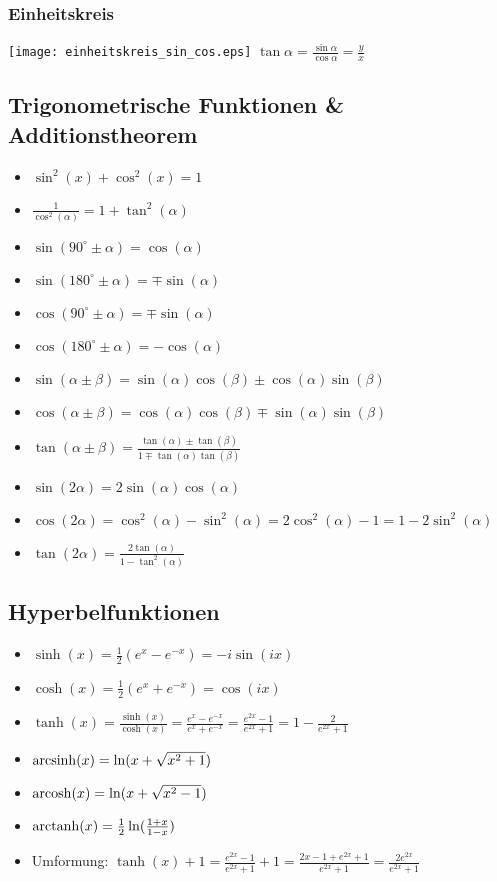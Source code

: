 \subsubsection{Einheitskreis}
\texttt{[image: einheitskreis\_sin\_cos.eps]}
$\tan \alpha = \frac{\sin \alpha}{\cos \alpha} = \frac{y}{x}$

\subsection{Trigonometrische Funktionen \& Additionstheorem}
\begin{itemize}[leftmargin=*]
	\item $\sin^2(x) + \cos^2(x) = 1$
	\item $\frac{1}{\cos^2(\alpha)} = 1 + \tan^2(\alpha)$
	\item $\sin(90^\circ \pm \alpha) = \cos(\alpha)$
	\item $\sin(180^\circ \pm \alpha) = \mp \sin(\alpha)$
	\item $\cos(90^\circ \pm \alpha) = \mp \sin(\alpha)$
	\item $\cos(180^\circ \pm \alpha) = - \cos(\alpha)$
	\item $\sin(\alpha \pm \beta) = \sin(\alpha)\cos(\beta) \pm
	\cos(\alpha)\sin(\beta)$
	\item $\cos(\alpha \pm \beta) = \cos(\alpha)\cos(\beta) \mp \sin(\alpha)
	\sin(\beta)$
	\item $\tan(\alpha \pm \beta) = \frac{\tan(\alpha) \pm \tan(\beta)}{1 \mp
	\tan(\alpha)\tan(\beta)}$
	\item $\sin(2\alpha) = 2 \sin(\alpha)\cos(\alpha)$
	\item $\cos(2\alpha) = \cos^2(\alpha) - \sin^2(\alpha) = 2 \cos^2(\alpha) - 1
	= 1 - 2 \sin^2(\alpha)$
	\item $\tan(2\alpha) = \frac{2 \tan(\alpha)}{1 - \tan^2(\alpha)}$
\end{itemize}

\subsection{Hyperbelfunktionen}
\begin{itemize}[leftmargin=*]
	\item $\sinh(x) = \frac{1}{2}(e^x - e^{-x}) = -i \sin(ix)$
	\item $\cosh(x) = \frac{1}{2}(e^x + e^{-x}) = \cos(ix)$
	\item $\tanh(x) = \frac{\sinh(x)}{\cosh(x)} = \frac{e^x - e^{-x}}{e^x +
	e^{-x}} = \frac{e^{2x} - 1}{e^{2x} + 1} = 1 - \frac{2}{e^{2x} + 1}$
	\item $\operatorname{arcsinh}(x) = \ln(x + \sqrt{x^2 + 1})$
	\item $\operatorname{arcosh}(x) = \ln(x + \sqrt{x^2 - 1})$
	\item $\operatorname{arctanh}(x) = \frac{1}{2} \ln(\frac{1+x}{1-x})$
	\item Umformung: $\tanh(x) + 1 = \frac{e^{2x} - 1}{e^{2x} + 1} + 1 = \frac{2x -
	1 + e^{2x} + 1}{e^{2x} + 1} = \frac{2e^{2x}}{e^{2x} + 1}$
\end{itemize}


